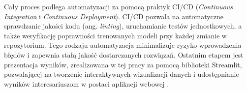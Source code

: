 Cały proces podlega automatyzacji za pomocą praktyk CI/CD (\textit{Continuous Integration} i \textit{Continuous Deployment}). CI/CD pozwala na automatyczne sprawdzanie jakości kodu (ang. \textit{linting}), uruchamianie testów jednostkowych, a także weryfikację poprawności trenowanych modeli przy każdej zmianie w repozytorium. Tego rodzaju automatyzacja minimalizuje ryzyko wprowadzenia błędów i zapewnia stałą jakość dostarczanych rozwiązań. Ostatnim etapem jest prezentacja wyników, zrealizowana w tej pracy za pomocą biblioteki Streamlit, pozwalającej na tworzenie interaktywnych wizualizacji danych i udostępnianie wyników interesariuszom w postaci aplikacji webowej \cite{Streamlit2023}.